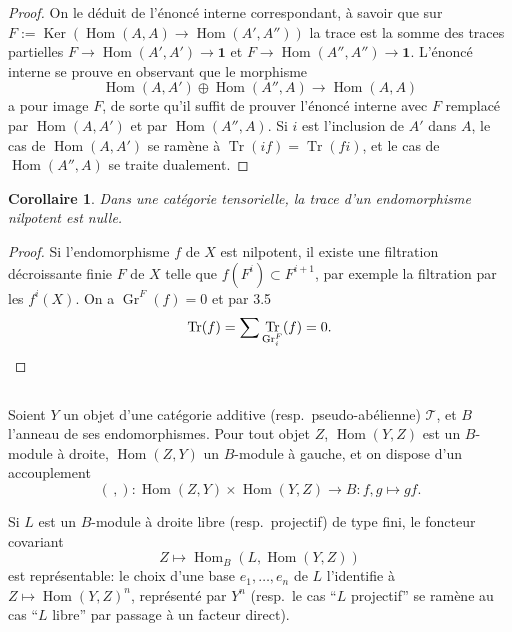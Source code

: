\documentclass[11pt,a4paper]{article}
\theoremstyle{plain}
\newtheorem{corollary}[theorem]{Corollaire}
\theoremstyle{definition}
\DeclareMathOperator{\Hom}{Hom}
\DeclareMathOperator{\Ker}{Ker}
\DeclareMathOperator{\Tr}{Tr}
\DeclareMathOperator{\Gr}{Gr}
\begin{document}
\begin{proof}
On le d\'eduit de l'\'enonc\'e interne correspondant, \`a savoir que sur $F := \Ker(\Hom(A, A) \to \Hom(A', A''))$ la trace est la somme des traces partielles $F \to \Hom(A', A') \to \mathbf{1}$ et $F \to \Hom(A'', A'') \to \mathbf{1}$. L'\'enonc\'e interne se prouve en observant que le morphisme
\[
\Hom(A, A') \oplus \Hom(A'', A) \to \Hom(A, A)
\]
a pour image $F$, de sorte qu'il suffit de prouver l'\'enonc\'e interne avec $F$ remplac\'e par $\Hom(A, A')$ et par $\Hom(A'', A)$. Si $i$ est l'inclusion de $A'$ dans $A$, le cas de $\Hom(A, A')$ se ram\`ene \`a $\Tr(if) = \Tr(fi)$, et le cas de $\Hom(A'', A)$ se traite dualement.
\end{proof}

\begin{corollary}
Dans une cat\'egorie tensorielle, la trace d'un endomorphisme nilpotent est nulle.
\end{corollary}

\begin{proof}
Si l'endomorphisme $f$ de $X$ est nilpotent, il existe une filtration d\'ecroissante finie $F$ de $X$ telle que $f(F^i) \subset F^{i+1}$, par exemple la filtration par les $f^i(X)$. On a $\Gr^F(f) = 0$ et par 3.5
\[
\Tr(f) = \sum \Tr_{\Gr^F_i}(f) = 0. \qedhere
\]
\end{proof}

\subsection{}
Soient $Y$ un objet d'une cat\'egorie additive (resp.~pseudo-ab\'elienne) $\mathcal{T}$, et $B$ l'anneau de ses endomorphismes. Pour tout objet $Z$, $\Hom(Y, Z)$ est un $B$-module \`a droite, $\Hom(Z, Y)$ un $B$-module \`a gauche, et on dispose d'un accouplement
\begin{equation}
(\,,) : \Hom(Z, Y) \times \Hom(Y, Z) \to B : f, g \longmapsto gf. \tag{3.7.1}
\end{equation}

Si $L$ est un $B$-module \`a droite libre (resp.~projectif) de type fini, le foncteur covariant
\begin{equation}
Z \longmapsto \Hom_B(L, \Hom(Y, Z)) \tag{3.7.2}
\end{equation}
est repr\'esentable: le choix d'une base $e_1, \ldots, e_n$ de $L$ l'identifie \`a $Z \mapsto \Hom(Y, Z)^n$, repr\'esent\'e par $Y^n$ (resp.~le cas ``$L$ projectif'' se ram\`ene au cas ``$L$ libre'' par passage \`a un facteur direct).
\end{document}
